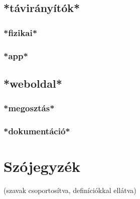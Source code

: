 \documentclass{article}
\begin{document}
\subsection{*távirányítók*}
\subsubsection{*fizikai*}
\subsubsection{*app*}

\subsection{*weboldal*}
\subsubsection{*megosztás*}
\subsubsection{*dokumentáció*}


\pagebreak
\section{Szójegyzék}

(szavak csoportosítva, definíciókkal ellátva)
\end{document}
